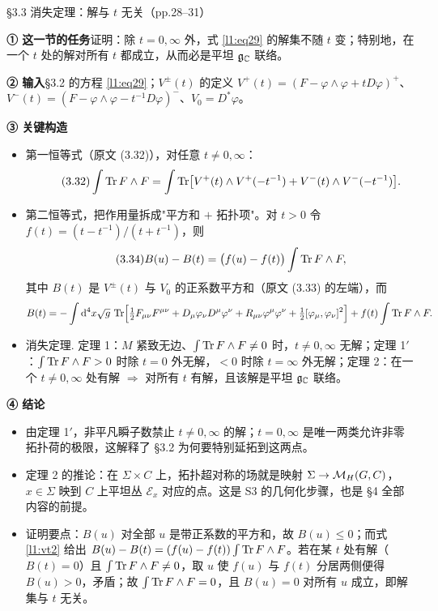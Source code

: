 \begin{kcard}{§3.3 消失定理：解与 $t$ 无关（pp.28--31）}

\noindent\textbf{① 这一节的任务}\quad 证明：除 $t=0,\infty$ 外，式 \eqref{l1:eq29} 的解集不随 $t$ 变；特别地，在一个 $t$ 处的解对所有 $t$ 都成立，从而必是平坦 $\mathfrak{g}_{\mathbb{C}}$ 联络。\pA{}

\noindent\textbf{② 输入}\quad \S3.2 的方程 \eqref{l1:eq29}；$V^\pm(t)$ 的定义 $V^+(t)=(F-\varphi\wedge\varphi+tD\varphi)^+$、$V^-(t)=(F-\varphi\wedge\varphi-t^{-1}D\varphi)^-$、$V_0=D^*\varphi$。

\noindent\textbf{③ 关键构造}\quad
\begin{itemize}
\item 第一恒等式（原文 (3.32)），对任意 $t\ne0,\infty$：
\begin{equation}\label{l1:vt1}\tag{3.32}
\int\operatorname{Tr} F\wedge F=\int\operatorname{Tr}\bigl[V^+(t)\wedge V^+(-t^{-1})+V^-(t)\wedge V^-(-t^{-1})\bigr].
\end{equation}
\pA{}
\item 第二恒等式，把作用量拆成"平方和 $+$ 拓扑项"。对 $t>0$ 令 $f(t)=(t-t^{-1})/(t+t^{-1})$，则
\begin{equation}\label{l1:vt2}\tag{3.34}
B(u)-B(t)=\bigl(f(u)-f(t)\bigr)\int\operatorname{Tr} F\wedge F ,
\end{equation}
其中 $B(t)$ 是 $V^\pm(t)$ 与 $V_0$ 的正系数平方和（原文 (3.33) 的左端），而
\[
B(t)=-\int\mathrm{d}^4x\sqrt g\,\operatorname{Tr}\Bigl[\tfrac12F_{\mu\nu}F^{\mu\nu}+D_\mu\varphi_\nu D^\mu\varphi^\nu+R_{\mu\nu}\varphi^\mu\varphi^\nu+\tfrac12[\varphi_\mu,\varphi_\nu]^2\Bigr]+f(t)\int\operatorname{Tr} F\wedge F .
\]
\pA{}
\item 消失定理. 定理 1：$M$ 紧致无边、$\int\operatorname{Tr} F\wedge F\ne0$ 时，$t\ne0,\infty$ 无解；定理 1$'$：$\int\operatorname{Tr} F\wedge F>0$ 时除 $t=0$ 外无解，$<0$ 时除 $t=\infty$ 外无解；定理 2：在一个 $t\ne0,\infty$ 处有解 $\Rightarrow$ 对所有 $t$ 有解，且该解是平坦 $\mathfrak{g}_{\mathbb{C}}$ 联络。\pA{}
\end{itemize}

\noindent\textbf{④ 结论}\quad
\begin{itemize}
\item 由定理 1$'$，非平凡瞬子数禁止 $t\ne0,\infty$ 的解；$t=0,\infty$ 是唯一两类允许非零拓扑荷的极限，这解释了 \S3.2 为何要特别延拓到这两点。\pA{}
\item 定理 2 的推论：在 $\Sigma\times C$ 上，拓扑超对称的场就是映射 $\Sigma\to\mathcal{M}_H(G,C)$，$x\in\Sigma$ 映到 $C$ 上平坦丛 $\mathcal E_x$ 对应的点。这是 S3 的几何化步骤，也是 \S4 全部内容的前提。\pA{}
\item 证明要点：$B(u)$ 对全部 $u$ 是带正系数的平方和，故 $B(u)\le0$；而式 \eqref{l1:vt2} 给出 $B(u)-B(t)=(f(u)-f(t))\int\operatorname{Tr} F\wedge F$。若在某 $t$ 处有解（$B(t)=0$）且 $\int\operatorname{Tr} F\wedge F\ne0$，取 $u$ 使 $f(u)$ 与 $f(t)$ 分居两侧便得 $B(u)>0$，矛盾；故 $\int\operatorname{Tr} F\wedge F=0$，且 $B(u)=0$ 对所有 $u$ 成立，即解集与 $t$ 无关。\pA{}
\end{itemize}


\end{kcard}
